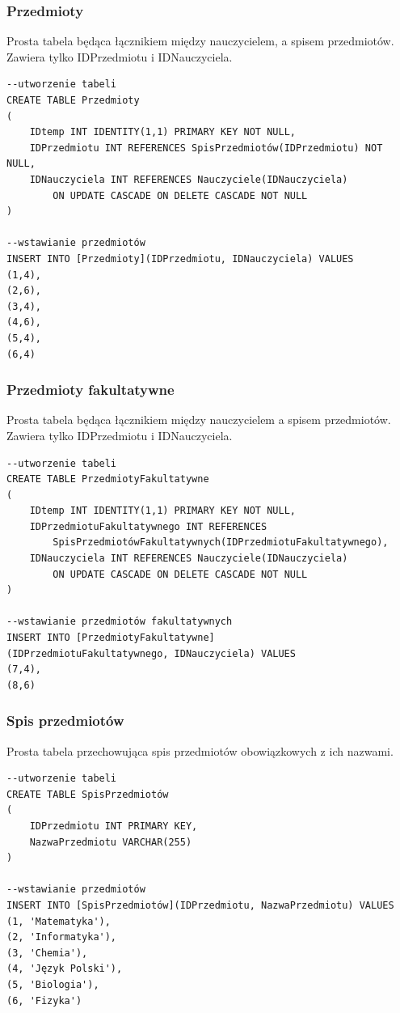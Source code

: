 \documentclass[60pt]{article}
\begin{document}
\subsubsection{Przedmioty}
 Prosta tabela będąca łącznikiem między nauczycielem, a spisem przedmiotów. Zawiera tylko IDPrzedmiotu i IDNauczyciela.
 
 \begin{verbatim}
--utworzenie tabeli
CREATE TABLE Przedmioty
(
    IDtemp INT IDENTITY(1,1) PRIMARY KEY NOT NULL,
    IDPrzedmiotu INT REFERENCES SpisPrzedmiotów(IDPrzedmiotu) NOT NULL,
    IDNauczyciela INT REFERENCES Nauczyciele(IDNauczyciela)
        ON UPDATE CASCADE ON DELETE CASCADE NOT NULL
)

--wstawianie przedmiotów
INSERT INTO [Przedmioty](IDPrzedmiotu, IDNauczyciela) VALUES
(1,4),
(2,6),
(3,4),
(4,6),
(5,4),
(6,4)
\end{verbatim}

\subsubsection{Przedmioty fakultatywne}
 Prosta tabela będąca łącznikiem między nauczycielem a spisem przedmiotów. Zawiera tylko IDPrzedmiotu i IDNauczyciela.
 
 \begin{verbatim}
--utworzenie tabeli
CREATE TABLE PrzedmiotyFakultatywne
(
    IDtemp INT IDENTITY(1,1) PRIMARY KEY NOT NULL,
    IDPrzedmiotuFakultatywnego INT REFERENCES
        SpisPrzedmiotówFakultatywnych(IDPrzedmiotuFakultatywnego),
    IDNauczyciela INT REFERENCES Nauczyciele(IDNauczyciela)
        ON UPDATE CASCADE ON DELETE CASCADE NOT NULL
)

--wstawianie przedmiotów fakultatywnych
INSERT INTO [PrzedmiotyFakultatywne]
(IDPrzedmiotuFakultatywnego, IDNauczyciela) VALUES
(7,4),
(8,6)
\end{verbatim}

\subsubsection{Spis przedmiotów}
Prosta tabela przechowująca spis przedmiotów obowiązkowych z ich nazwami.

 \begin{verbatim}
--utworzenie tabeli
CREATE TABLE SpisPrzedmiotów
(
    IDPrzedmiotu INT PRIMARY KEY,
    NazwaPrzedmiotu VARCHAR(255)
)

--wstawianie przedmiotów
INSERT INTO [SpisPrzedmiotów](IDPrzedmiotu, NazwaPrzedmiotu) VALUES
(1, 'Matematyka'),
(2, 'Informatyka'),
(3, 'Chemia'),
(4, 'Język Polski'),
(5, 'Biologia'),
(6, 'Fizyka')
\end{verbatim}
\end{document}
